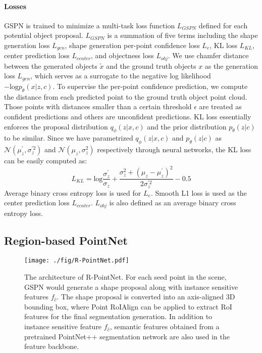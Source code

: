\documentclass[10pt,twocolumn,letterpaper]{article}
\begin{document}
\paragraph{Losses} GSPN is trained to minimize a multi-task loss function $L_{GSPN}$ defined for each potential object proposal. $L_{GSPN}$ is a summation of five terms including the shape generation loss $L_{gen}$, shape generation per-point confidence loss $L_{e}$, KL loss $L_{KL}$, center prediction loss $L_{center}$, and objectness loss $L_{obj}$. We use chamfer distance between the generated objects $\tilde{x}$ and the ground truth objects $x$ as the generation loss $L_{gen}$, which serves as a surrogate to the negative log likelihood $-\text{log}p_{\theta}(x|z,c)$. To supervise the per-point confidence prediction, we compute the distance from each predicted point to the ground truth object point cloud. Those points with distances smaller than a certain threshold $\epsilon$ are treated as confident predictions and others are unconfident predictions. KL loss essentially enforces the proposal distribution $q_{\phi}(z|x,c)$ and the prior distribution $p_{\theta}(z|c)$ to be similar. Since we have parametrized $q_{\phi}(z|x,c)$ and $p_{\theta}(z|c)$ as $\mathcal{N}(\mu_z^{\prime}, \sigma_z^{\prime 2})$ and $\mathcal{N}(\mu_z, \sigma_z^2)$ respectively through neural networks, the KL loss can be easily computed as:
\vspace{-0.5\baselineskip}
\begin{equation}
L_{KL} = \text{log}\frac{\sigma_z^{\prime}}{\sigma_z}+\frac{\sigma_z^2+(\mu_z-\mu_z^{\prime})^2}{2\sigma_z^{\prime 2}}-0.5
\end{equation}
\noindent
Average binary cross entropy loss is used for $L_e$. Smooth L1 loss \cite{girshick2015fast} is used as the center prediction loss $L_{center}$. $L_{obj}$ is also defined as an average binary cross entropy loss.

\subsection{Region-based PointNet}
\begin{figure*}[t!]
    \centering
    \texttt{[image: ./fig/R-PointNet.pdf]}
    \caption{The architecture of R-PointNet. For each seed point in the scene, GSPN would generate a shape proposal along with instance sensitive features $f_{\hat{c}}$. The shape proposal is converted into an axis-aligned 3D bounding box, where Point RoIAlign can be applied to extract RoI features for the final segmentation generation. In addition to instance sensitive feature $f_{\hat{c}}$, semantic features obtained from a pretrained PointNet++ segmentation network are also used in the feature backbone.}
    \label{fig:rpointnet}
    \vspace{-\baselineskip}
\end{figure*}
\end{document}
